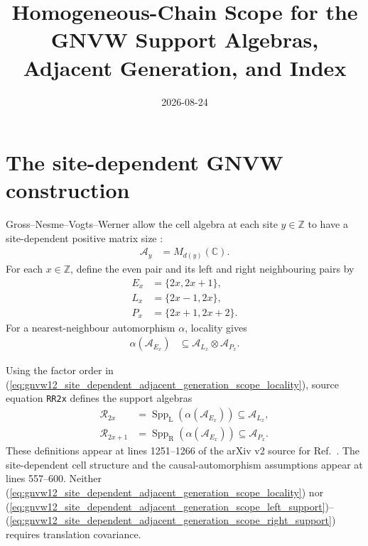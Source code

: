 \documentclass[11pt]{article}
\title{Homogeneous-Chain Scope for the GNVW Support Algebras,
Adjacent Generation, and Index}
\author{}
\date{2026-08-24}
\begin{document}
\maketitle
{}

\section{The site-dependent GNVW construction}

Gross--Nesme--Vogts--Werner allow the cell algebra at each site
$y\in\mathbb Z$ to have a site-dependent positive matrix size
\cite[Section~7.2]{Gross2012IndexTheory}:
\begin{align}
    \mathcal A_y
     & =M_{d(y)}(\mathbb C).
    \label{eq:gnvw12_site_dependent_adjacent_generation_scope_cell_algebra}
\end{align}
For each $x\in\mathbb Z$, define the even pair and its left and right
neighbouring pairs by
\begin{align}
    E_x
     & =\{2x,2x+1\},
    \label{eq:gnvw12_site_dependent_adjacent_generation_scope_even_pair} \\
    L_x
     & =\{2x-1,2x\},
    \label{eq:gnvw12_site_dependent_adjacent_generation_scope_left_pair} \\
    P_x
     & =\{2x+1,2x+2\}.
    \label{eq:gnvw12_site_dependent_adjacent_generation_scope_right_pair}
\end{align}
For a nearest-neighbour automorphism $\alpha$, locality gives
\begin{align}
    \alpha(\mathcal A_{E_x})
     & \subseteq
    \mathcal A_{L_x}\otimes\mathcal A_{P_x}.
    \label{eq:gnvw12_site_dependent_adjacent_generation_scope_locality}
\end{align}

Using the factor order in
(\ref{eq:gnvw12_site_dependent_adjacent_generation_scope_locality}), source
equation \texttt{RR2x} defines the support algebras
\begin{align}
    \mathcal R_{2x}
     & =\operatorname{Spp}_{\mathrm L}
    (\alpha(\mathcal A_{E_x}))
    \subseteq\mathcal A_{L_x},
    \label{eq:gnvw12_site_dependent_adjacent_generation_scope_left_support} \\
    \mathcal R_{2x+1}
     & =\operatorname{Spp}_{\mathrm R}
    (\alpha(\mathcal A_{E_x}))
    \subseteq\mathcal A_{P_x}.
    \label{eq:gnvw12_site_dependent_adjacent_generation_scope_right_support}
\end{align}
These definitions appear at lines 1251--1266 of the arXiv v2 source for
Ref.~\cite{Gross2012IndexTheory}. The site-dependent cell structure and the
causal-automorphism assumptions appear at lines 557--600. Neither
(\ref{eq:gnvw12_site_dependent_adjacent_generation_scope_locality}) nor
(\ref{eq:gnvw12_site_dependent_adjacent_generation_scope_left_support})--%
(\ref{eq:gnvw12_site_dependent_adjacent_generation_scope_right_support})
requires translation covariance.
\end{document}

